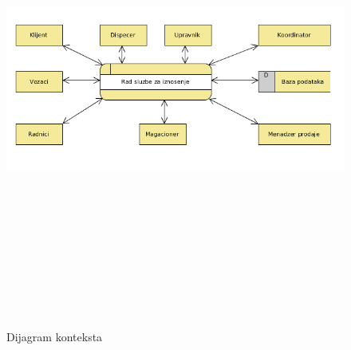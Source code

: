 \documentclass[10 pt]{article}
\begin{document}
	\begin{figure}[H]
		\centering
		\includegraphics[width=15cm,height=15cm,keepaspectratio]{slike/DijagramKonteksta.png}\\
		\caption{Dijagram konteksta}
		\label{fig:dijagramKonteksta}
	\end{figure}
\end{document}
